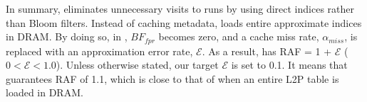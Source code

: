 In summary, \ours{} eliminates unnecessary visits to runs 
by using direct indices rather than Bloom filters. 
Instead of caching metadata,
\ours{} loads entire approximate indices in DRAM.
By doing so, in \ours{}, $BF_{fpr}$ becomes zero,
and a cache miss rate, $\alpha_{miss}$, is replaced with an approximation 
error rate, $\mathcal{E}$. As a result,
\ours{} has RAF = 1 + $\mathcal{E}$ ($0 < \mathcal{E} < 1.0$).
Unless otherwise stated, our target $\mathcal{E}$ is set to 0.1.
It means that \ours{} guarantees RAF of 1.1, which is close
to that of when an entire L2P table is loaded in DRAM.

\begin{comment}
First, high RAF caused by looking up runs in the tree never occur
in \ours{}. Instead, by looking up the shortcut table, \ours{} is able to 
visit a target run without extra reads.
Moreover, since all the indices are kept in the memory entirely,
\ours{} is not 
affected by various factors we cannot control, such as temporal and spatial
locality of workloads and system conditions (\ie~fragmentation).
On the contrary, the read latency of \ours{} is only decided by a preset error
rate. Even under random I/O workloads running over severely fragmented space,
the error rate of \ours{} is maintained at a target level. This property of
\ours{} enables us to guarantee the expected performance all the time,
regardless of input workloads and system conditions.
\end{comment}

\begin{comment}
\begin{itemize}[leftmargin=*]
\item \textbf{Principle \#4 -- Balancing the tree for balanced WAF}:
High WAF caused by compaction is another drawback of the LSM-tree.  \ours{}
reduces WAF of the tree by adjusting the organization of a tree, offering a 
offering a sufficiently low WAF (see~\SEC{todo}). Moreover,
by combining FTL's GC and compaction and by optimizing compaction process
to minimize amount of data to migrate, \ours{} achieves comparable 
WAF to other index structures. This does not
diminish the value of \ours{} as reads have a higher impact on user-perceived
performance. Write throughput of SSDs can also be optimized in various
ways via write buffering~\cite{write-buffer}, 
write suspension/resume~\cite{suspension}, and
so on.
\end{itemize}
\end{comment}

